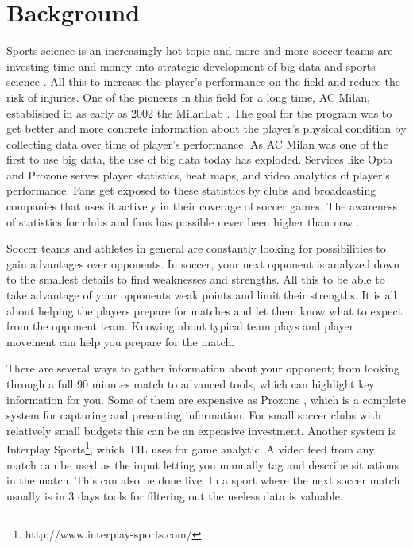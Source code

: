 \section{Background}

Sports science is an increasingly hot topic and more and more soccer teams are investing time and money into strategic development of big data and sports science \cite{bigdata:majorleague}. All this to increase the player’s performance on the field and reduce the risk of injuries. One of the pioneers in this field for a long time, AC Milan, established in as early as 2002 the MilanLab \cite{bigdata:milanlab}. The goal for the program was to get better and more concrete information about the player’s physical condition by collecting data over time of player’s performance. As AC Milan was one of the first to use big data, the use of big data today has exploded. Services like Opta and Prozone serves player statistics, heat maps, and video analytics of player’s performance. Fans get exposed to these statistics by clubs and broadcasting companies that uses it actively in their coverage of soccer games. The awareness of statistics for clubs and fans has possible never been higher than now \cite{dailymailOnStatistics}.

Soccer teams and athletes in general are constantly looking for possibilities to gain advantages over opponents. In soccer, your next opponent is analyzed down to the smallest details to find weaknesses and strengths. All this to be able to take advantage of your opponents weak points and limit their strengths. It is all about helping the players prepare for matches and let them know what to expect from the opponent team. Knowing about typical team plays and player movement can help you prepare for the match. 

There are several ways to gather information about your opponent; from looking through a full 90 minutes match to advanced tools, which can highlight key information for you. Some of them are expensive as Prozone \cite{Prozone:indepth}, which is a complete system for capturing and presenting information. For small soccer clubs with relatively small budgets this can be an expensive investment. Another system is Interplay Sports\footnote{http://www.interplay-sports.com/}, which \ac{TIL} uses for game analytic. A video feed from any match can be used as the input letting you manually tag and describe situations in the match. This can also be done live. In a sport where the next soccer match usually is in 3 days tools for filtering out the useless data is valuable.

